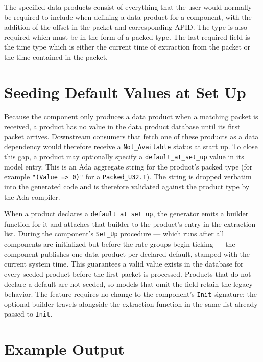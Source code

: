 
The specified data products consist of everything that the user would normally be required to include when defining a data product for a component, with the addition of the offset in the packet and corresponding APID. The type is also required which must be in the form of a packed type. The last required field is the time type which is either the current time of extraction from the packet or the time contained in the packet.

\section{Seeding Default Values at Set Up}

Because the component only produces a data product when a matching packet is received, a product has no value in the data product database until its first packet arrives. Downstream consumers that fetch one of these products as a data dependency would therefore receive a \texttt{Not\_Available} status at start up. To close this gap, a product may optionally specify a \texttt{default\_at\_set\_up} value in its model entry. This is an Ada aggregate string for the product's packed type (for example \texttt{"(Value => 0)"} for a \texttt{Packed\_U32.T}). The string is dropped verbatim into the generated code and is therefore validated against the product type by the Ada compiler.

When a product declares a \texttt{default\_at\_set\_up}, the generator emits a builder function for it and attaches that builder to the product's entry in the extraction list. During the component's \texttt{Set\_Up} procedure --- which runs after all components are initialized but before the rate groups begin ticking --- the component publishes one data product per declared default, stamped with the current system time. This guarantees a valid value exists in the database for every seeded product before the first packet is processed. Products that do not declare a default are not seeded, so models that omit the field retain the legacy behavior. The feature requires no change to the component's \texttt{Init} signature: the optional builder travels alongside the extraction function in the same list already passed to \texttt{Init}.

\section{Example Output}

